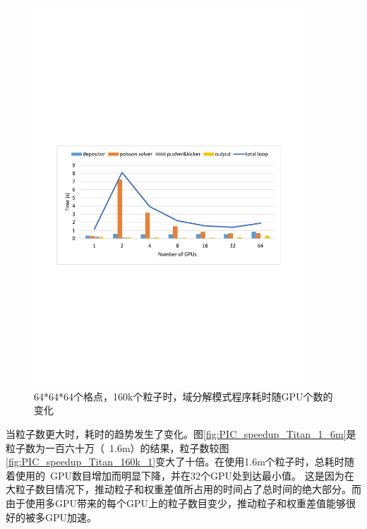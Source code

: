 \begin{figure}[!htb]
  \centering
  \includegraphics[width=0.9\textwidth]{Img/PIC_speedup_Titan_160k_2.pdf}
  \caption{64*64*64个格点，160k个粒子时，域分解模式程序耗时随GPU个数的变化}
  \label{fig:PIC_speedup_Titan_160k_2}
\end{figure}

当粒子数更大时，耗时的趋势发生了变化。图\ref{fig:PIC_speedup_Titan_1_6m}是粒子数为一百六十万（~1.6m）的结果，粒子数较图\ref{fig:PIC_speedup_Titan_160k_1}变大了十倍。在使用1.6m个粒子时，总耗时随着使用的~GPU数目增加而明显下降，并在32个GPU处到达最小值。
这是因为在大粒子数目情况下，推动粒子和权重差值所占用的时间占了总时间的绝大部分。而由于使用多GPU带来的每个GPU上的粒子数目变少，推动粒子和权重差值能够很好的被多GPU加速。

